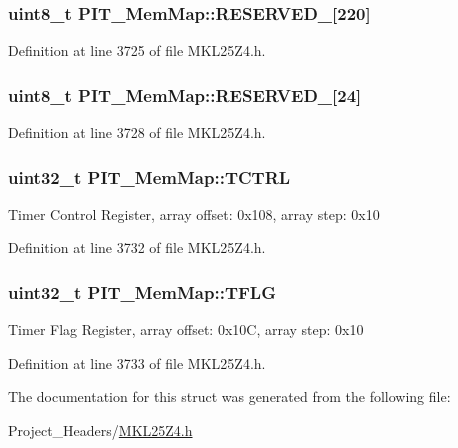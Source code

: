 \subsubsection[{\texorpdfstring{R\+E\+S\+E\+R\+V\+E\+D\+\_\+0}{RESERVED_0}}]{\setlength{\rightskip}{0pt plus 5cm}uint8\+\_\+t P\+I\+T\+\_\+\+Mem\+Map\+::\+R\+E\+S\+E\+R\+V\+E\+D\+\_\mbox{[}220\mbox{]}}\hypertarget{struct_p_i_t___mem_map_a5f7a470756732a5034b4a4fb735da592}{}\label{struct_p_i_t___mem_map_a5f7a470756732a5034b4a4fb735da592}


Definition at line 3725 of file M\+K\+L25\+Z4.\+h.

\subsubsection[{\texorpdfstring{R\+E\+S\+E\+R\+V\+E\+D\+\_\+1}{RESERVED_1}}]{\setlength{\rightskip}{0pt plus 5cm}uint8\+\_\+t P\+I\+T\+\_\+\+Mem\+Map\+::\+R\+E\+S\+E\+R\+V\+E\+D\+\_\mbox{[}24\mbox{]}}\hypertarget{struct_p_i_t___mem_map_a0fcee596fdc7a7f9696169156ee9a433}{}\label{struct_p_i_t___mem_map_a0fcee596fdc7a7f9696169156ee9a433}


Definition at line 3728 of file M\+K\+L25\+Z4.\+h.

\subsubsection[{\texorpdfstring{T\+C\+T\+RL}{TCTRL}}]{\setlength{\rightskip}{0pt plus 5cm}uint32\+\_\+t P\+I\+T\+\_\+\+Mem\+Map\+::\+T\+C\+T\+RL}\hypertarget{struct_p_i_t___mem_map_a567cdea5c7d615341f95f1438020a7e1}{}\label{struct_p_i_t___mem_map_a567cdea5c7d615341f95f1438020a7e1}
Timer Control Register, array offset\+: 0x108, array step\+: 0x10 

Definition at line 3732 of file M\+K\+L25\+Z4.\+h.

\subsubsection[{\texorpdfstring{T\+F\+LG}{TFLG}}]{\setlength{\rightskip}{0pt plus 5cm}uint32\+\_\+t P\+I\+T\+\_\+\+Mem\+Map\+::\+T\+F\+LG}\hypertarget{struct_p_i_t___mem_map_add88e740d4ec7a83e66cf9ad79cd027a}{}\label{struct_p_i_t___mem_map_add88e740d4ec7a83e66cf9ad79cd027a}
Timer Flag Register, array offset\+: 0x10C, array step\+: 0x10 

Definition at line 3733 of file M\+K\+L25\+Z4.\+h.



The documentation for this struct was generated from the following file\+:\begin{DoxyCompactItemize}
\item 
Project\+\_\+\+Headers/\hyperlink{_m_k_l25_z4_8h}{M\+K\+L25\+Z4.\+h}\end{DoxyCompactItemize}
